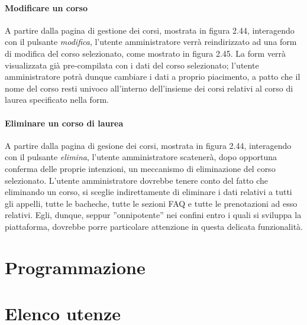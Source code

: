 \documentclass [a4paper,11pt]{book}
\begin{document}
\medskip 

\subsubsection{Modificare un corso}

A partire dalla pagina di gestione dei corsi, mostrata in figura 2.44, interagendo con il pulsante \emph{modifica}, l'utente amministratore verrà reindirizzato ad una form di modifica del corso selezionato, come mostrato in figura 2.45. La form verrà visualizzata già pre-compilata con i dati del corso selezionato; l'utente amministratore potrà dunque cambiare i dati a proprio piacimento, a patto che il nome del corso resti univoco all'interno dell'insieme dei corsi relativi al corso di laurea specificato nella form.


\medskip

\subsubsection{Eliminare un corso di laurea}

A partire dalla pagina di gesione dei corsi, mostrata in figura 2.44, interagendo con il pulsante \emph{elimina}, l'utente amministratore scatenerà, dopo opportuna conferma delle proprie intenzioni, un meccanismo di eliminazione del corso selezionato. L'utente amministratore dovrebbe tenere conto del fatto che eliminando un corso, si sceglie indirettamente di eliminare i dati relativi a tutti gli appelli, tutte le bacheche, tutte le sezioni FAQ e tutte le prenotazioni ad esso relativi. Egli, dunque, seppur ''onnipotente'' nei confini entro i quali si sviluppa la piattaforma, dovrebbe porre particolare attenzione in questa delicata funzionalità.

\medskip
\medskip

\chapter{Programmazione}

\chapter{Elenco utenze}
\end{document}
